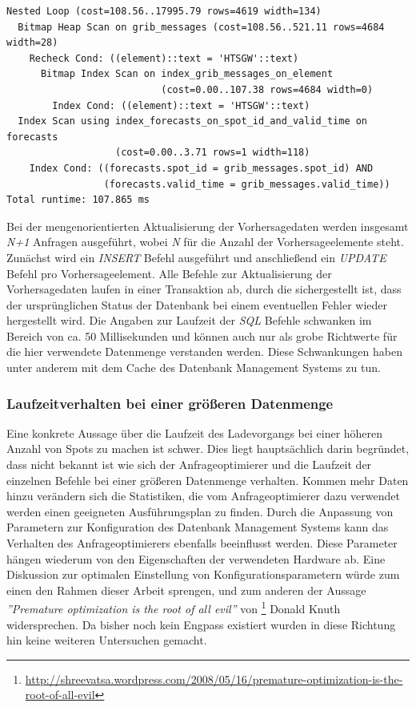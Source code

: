 \begin{lstlisting}[captionpos=b, caption=Ausführungsplan der Aktualisierung, label=forecasts:update_explain]
Nested Loop (cost=108.56..17995.79 rows=4619 width=134)
  Bitmap Heap Scan on grib_messages (cost=108.56..521.11 rows=4684 width=28)
    Recheck Cond: ((element)::text = 'HTSGW'::text)
      Bitmap Index Scan on index_grib_messages_on_element  
                           (cost=0.00..107.38 rows=4684 width=0)
        Index Cond: ((element)::text = 'HTSGW'::text)
  Index Scan using index_forecasts_on_spot_id_and_valid_time on forecasts 
                   (cost=0.00..3.71 rows=1 width=118)
    Index Cond: ((forecasts.spot_id = grib_messages.spot_id) AND 
                 (forecasts.valid_time = grib_messages.valid_time))
Total runtime: 107.865 ms
\end{lstlisting}

Bei der mengenorientierten Aktualisierung der Vorhersagedaten werden
insgesamt \textit{N+1} Anfragen ausgeführt, wobei \textit{N} für die
Anzahl der Vorhersageelemente steht. Zunächst wird ein \textit{INSERT}
Befehl ausgeführt und anschließend ein \textit{UPDATE} Befehl pro
Vorhersageelement. Alle Befehle zur Aktualisierung der Vorhersagedaten
laufen in einer Transaktion ab, durch die sichergestellt ist, dass der
ursprünglichen Status der Datenbank bei einem eventuellen Fehler
wieder hergestellt wird. Die Angaben zur Laufzeit der \textit{SQL}
Befehle schwanken im Bereich von ca. 50 Millisekunden und können auch
nur als grobe Richtwerte für die hier verwendete Datenmenge verstanden
werden. Diese Schwankungen haben unter anderem mit dem Cache des
Datenbank Management Systems zu tun.

\subsubsection{Laufzeitverhalten bei einer größeren Datenmenge}
Eine konkrete Aussage über die Laufzeit des Ladevorgangs bei einer
höheren Anzahl von Spots zu machen ist schwer. Dies liegt
hauptsächlich darin begründet, dass nicht bekannt ist wie sich der
Anfrageoptimierer und die Laufzeit der einzelnen Befehle bei einer
größeren Datenmenge verhalten. Kommen mehr Daten hinzu verändern sich
die Statistiken, die vom Anfrageoptimierer dazu verwendet werden einen
geeigneten Ausführungsplan zu finden. Durch die Anpassung von
Parametern zur Konfiguration des Datenbank Management Systems kann das
Verhalten des Anfrageoptimierers ebenfalls beeinflusst werden. Diese
Parameter hängen wiederum von den Eigenschaften der verwendeten
Hardware ab. Eine Diskussion zur optimalen Einstellung von
Konfigurationsparametern würde zum einen den Rahmen dieser Arbeit
sprengen, und zum anderen der Aussage \textit{''Premature optimization
  is the root of all evil''} von
\footnote{\url{http://shreevatsa.wordpress.com/2008/05/16/premature-optimization-is-the-root-of-all-evil}}
Donald Knuth widersprechen. Da bisher noch kein Engpass existiert
wurden in diese Richtung hin keine weiteren Untersuchen gemacht.

